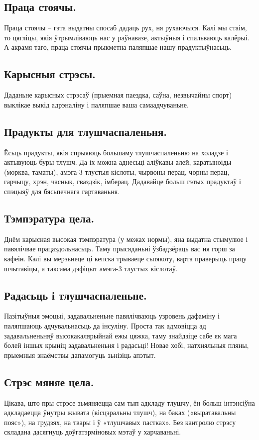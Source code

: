 \subsection{Праца стоячы.}
Праца стоячы – гэта выдатны спосаб дадаць рух, ня рухаючыся. Калі мы стаім, то цягліцы, якія ўтрымліваюць нас у раўнавазе, актыўныя і спальваюць калёрыі. А акрамя таго, праца стоячы прыкметна паляпшае нашу прадуктыўнасьць.

\subsection{Карысныя стрэсы.}
Даданьне карысных стрэсаў (прыемная паездка, саўна, незвычайны спорт) выклікае выкід адрэналіну і паляпшае ваша самаадчуваньне.

\subsection{Прадукты для тлушчаспаленьня.}
Ёсьць прадукты, якія спрыяюць большаму тлушчаспаленьню на холадзе і актывуюць буры тлушч. Да іх можна аднесьці аліўкавы алей, каратыноіды (морква, таматы), амэга-3 тлустыя кіслоты, чырвоны перац, чорны перац, гарчыцу, хрэн, часнык, гваздзік, імберац. Дадавайце больш гэтых прадуктаў і спэцыяў для бясьпечнага гартаваньня.

\subsection{Тэмпэратура цела.}
Днём карысная высокая тэмпэратура (у межах нормы), яна выдатна стымулюе і павялічвае працаздольнасьць. Таму прысяданьні ўзбадзёраць вас ня горш за кафеін. Калі вы мерзьнеце ці кепска трываеце сьпякоту, варта праверыць працу шчытавіцы, а таксама дэфіцыт амэга-3 тлустых кіслотаў.

\subsection{Радасьць і тлушчаспаленьне.}
Пазітыўныя эмоцыі, задавальненьне павялічваюць узровень дафаміну і паляпшаюць адчувальнасьць да інсуліну. Проста так адмовіцца ад задавальненьняў высокакалярыйнай ежы цяжка, таму знайдзіце сабе як мага болей іншых крыніц задавальненьня і радасьці! Новае хобі, натхняльныя пляны, прыемныя знаёмствы дапамогуць зьнізіць апэтыт.

\subsection{Стрэс мяняе цела.}
Цікава, што пры стрэсе зьмяняецца сам тып адкладу тлушчу, ён больш інтэнсіўна адкладаецца ўнутры жывата (вісцэральны тлушч), на баках («выратавальны пояс»), на грудзях, на твары і ў «тлушчавых пастках». Без кантролю стрэсу складана дасягнуць доўгатэрміновых мэтаў у харчаваньні.

